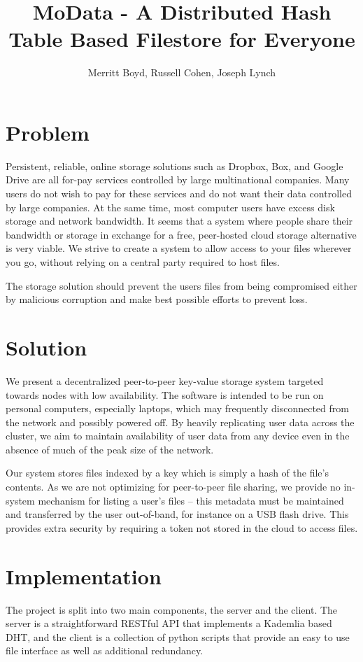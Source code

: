 \documentclass[a4paper,10pt]{article}
\title{MoData - A Distributed Hash Table Based Filestore for Everyone}
\author{Merritt Boyd, Russell Cohen, Joseph Lynch}
\begin{document}
\maketitle

\section{Problem}
Persistent, reliable, online storage solutions such as Dropbox, Box, and Google 
Drive are all for-pay services controlled by large multinational companies.  
Many users do not wish to pay for these services and do not want their data 
controlled by large companies.  At the same time, most computer users have 
excess disk storage and network bandwidth. It seems that a system where people 
share their bandwidth or storage in exchange for a free, peer-hosted cloud 
storage alternative is very viable. We strive to create a system to allow 
access to your files wherever you go, without relying on a central party 
required to host files.

The storage solution should prevent the users files from being compromised 
either by malicious corruption and make best possible efforts to prevent loss.

\section{Solution}
We present a decentralized peer-to-peer key-value storage system targeted 
towards nodes with low availability. The software is intended to be run on 
personal computers, especially laptops, which may frequently disconnected from 
the network and possibly powered off.  By heavily replicating user data 
across the cluster, we aim to maintain availability of user data from any device 
even in the absence of much of the peak size of the network.

Our system stores files indexed by a key which is simply a hash of the file’s 
contents.  As we are not optimizing for peer-to-peer file sharing, we provide no 
in-system mechanism for listing a user’s files -- this metadata must be 
maintained and transferred by the user out-of-band, for instance on a USB flash 
drive.  This provides extra security by requiring a token not stored in the 
cloud to access files.

\section{Implementation}
The project is split into two main components, the server and the client.  The 
server is a straightforward RESTful API that implements a Kademlia based DHT, 
and the client is a collection of python scripts that provide an easy to use 
file interface as well as additional redundancy.
\end{document}
